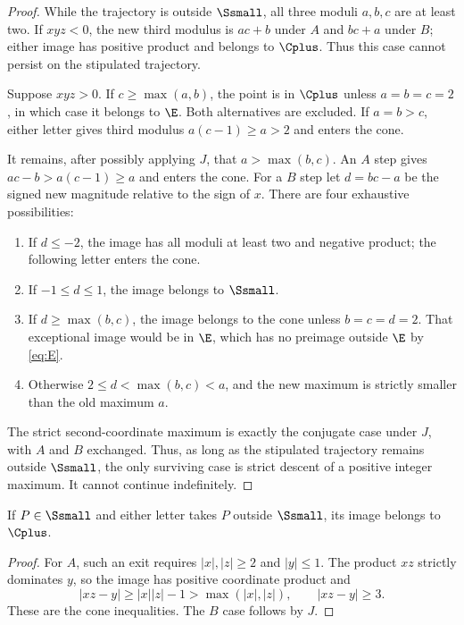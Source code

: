 \begin{proof}
While the trajectory is outside $\Ssmall$, all three moduli
$a,b,c$ are at least two. If $xyz<0$, the new third modulus
is $ac+b$ under $A$ and $bc+a$ under $B$; either image has
positive product and belongs to $\Cplus$. Thus this case
cannot persist on the stipulated trajectory.

Suppose $xyz>0$. If $c\ge\max(a,b)$, the point is in
$\Cplus$ unless $a=b=c=2$, in which case it belongs to
$\E$. Both alternatives are excluded. If $a=b>c$, either
letter gives third modulus $a(c-1)\ge a>2$ and enters the
cone.

It remains, after possibly applying $J$, that
$a>\max(b,c)$. An $A$ step gives
$ac-b>a(c-1)\ge a$ and enters the cone. For a $B$ step let
$d=bc-a$ be the signed new magnitude relative to the sign
of $x$. There are four exhaustive possibilities:
\begin{enumerate}
\item If $d\le-2$, the image has all moduli at least two
and negative product; the following letter enters the cone.
\item If $-1\le d\le1$, the image belongs to $\Ssmall$.
\item If $d\ge\max(b,c)$, the image belongs to the cone
unless $b=c=d=2$. That exceptional image would be in
$\E$, which has no preimage outside $\E$ by \eqref{eq:E}.
\item Otherwise $2\le d<\max(b,c)<a$, and the new maximum
is strictly smaller than the old maximum $a$.
\end{enumerate}
The strict second-coordinate maximum is exactly the conjugate
case under $J$, with $A$ and $B$ exchanged. Thus, as long as
the stipulated trajectory remains outside $\Ssmall$, the
only surviving case is strict descent of a positive integer
maximum. It cannot continue indefinitely.
\end{proof}

\begin{lemma}\label{lem:exit}
If $P\in\Ssmall$ and either letter takes $P$ outside
$\Ssmall$, its image belongs to $\Cplus$.
\end{lemma}

\begin{proof}
For $A$, such an exit requires $|x|,|z|\ge2$ and $|y|\le1$.
The product $xz$ strictly dominates $y$, so the image has
positive coordinate product and
\[
 |xz-y|\ge |x||z|-1>\max(|x|,|z|),\qquad |xz-y|\ge3.
\]
These are the cone inequalities. The $B$ case follows by $J$.
\end{proof}

